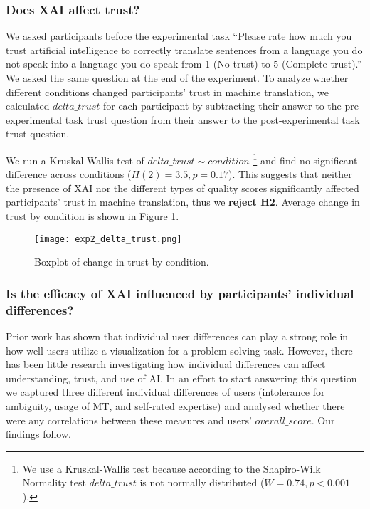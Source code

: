 \subsubsection{Does XAI affect trust?}

We asked participants before the experimental task “Please rate how much you trust artificial intelligence to correctly translate sentences from a language you do not speak into a language you do speak from 1 (No trust) to 5 (Complete trust).”  We asked the same question at the end of the experiment. To analyze whether different conditions changed participants' trust in machine translation, we calculated $delta\_trust$ for each participant by subtracting their answer to the pre-experimental task trust question from their answer to the post-experimental task trust question. 

We run a Kruskal-Wallis test of $delta\_trust \sim condition$ \footnote{We use a Kruskal-Wallis test because according to the Shapiro-Wilk Normality test $delta\_trust$ is not normally distributed ($W = 0.74, p < 0.001$).} and find no significant difference across conditions ($H(2) = 3.5, p = 0.17$). This suggests that neither the presence of XAI nor the different types of quality scores significantly affected participants’ trust in machine translation, thus we \textbf{reject H2}. Average change in trust by condition is shown in Figure \ref{fig:exp_delta_trust}.

\begin{figure}[h!]
    \centering
    \texttt{[image: exp2\_delta\_trust.png]}
    \caption{Boxplot of change in trust by condition.}
    \label{fig:exp_delta_trust}
\end{figure}

\subsubsection{Is the efficacy of XAI influenced by participants' individual differences?}

Prior work has shown that individual user differences can play a strong role in how well users utilize a visualization for a problem solving task\cite{liuSurvey2020}. However, there has been little research investigating how individual differences can affect understanding, trust, and use of AI. In an effort to start answering this question we captured three different individual differences of users (intolerance for ambiguity, usage of MT, and self-rated expertise) and analysed whether there were any correlations between these measures and users’ $overall\_score$. Our findings follow.

